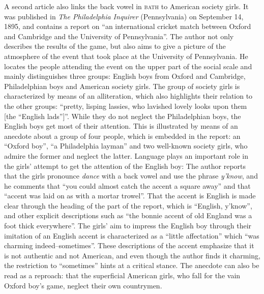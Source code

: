 A second article also links the back vowel in \textsc{bath} to American society girls. It was published in \emph{The Philadelphia Inquirer} (Pennsylvania) on September 14, 1895, and contains a report on “an international cricket match between Oxford and Cambridge and the University of Pennsylvania”. The author not only describes the results of the game, but also aims to give a picture of the atmosphere of the event that took place at the University of Pennsylvania. He locates the people attending the event on the upper part of the social scale and mainly distinguishes three groups: English boys from Oxford and Cambridge, Philadelphian boys and American society girls. The group of society girls is characterized by means of an alliteration, which also highlights their relation to the other groups: “pretty, lisping lassies, who lavished lovely looks upon them [the “English lads”]”. While they do not neglect the Philadelphian boys, the English boys get most of their attention. This is illustrated by means of an anecdote about a group of four people, which is embedded in the report: an “Oxford boy”, “a Philadelphia layman” and two well-known society girls, who admire the former and neglect the latter. Language plays an important role in the girls’ attempt to get the attention of the English boy: The author reports that the girls pronounce \emph{dance} with a back vowel and use the phrase \emph{y’know},\emph{} and he comments that “you could almost catch the accent a square away” and that “accent was laid on as with a mortar trowel”. That the accent is English is made clear through the heading of the part of the report, which is “English, y’know”, and other explicit descriptions such as “the bonnie accent of old England was a foot thick everywhere”. The girls’ aim to impress the English boy through their imitation of an English accent is characterized as a “little affectation” which “was charming indeed–sometimes”. These descriptions of the accent emphasize that it is not authentic and not American, and even though the author finds it charming, the restriction to “sometimes” hints at a critical stance. The anecdote can also be read as a reproach: that the superficial American girls, who fall for the vain Oxford boy’s game, neglect their own countrymen.


